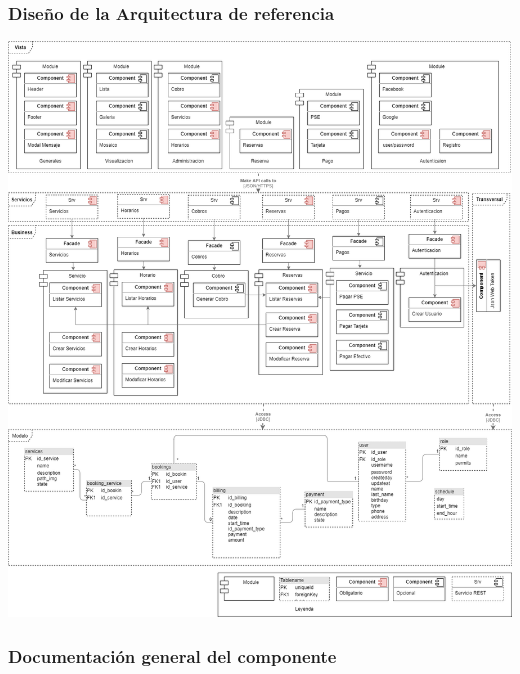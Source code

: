 \documentclass[10pt,a4paper,openany]{book}
\begin{document}
\subsubsection{Diseño de la Arquitectura de referencia}
\begin{center}
\includegraphics[width=1\textwidth]{arq3}
\end{center}
\vspace{3cm}

\subsubsection{Documentación general del componente }
\end{document}
